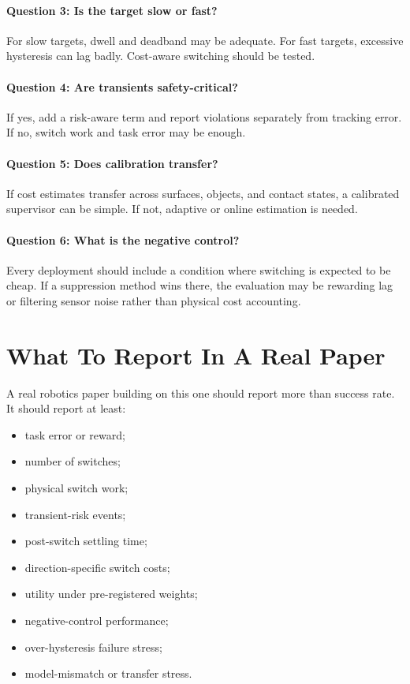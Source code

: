 \documentclass{article}
\begin{document}
\paragraph{Question 3: Is the target slow or fast?}
For slow targets, dwell and deadband may be adequate.
For fast targets, excessive hysteresis can lag badly.
Cost-aware switching should be tested.

\paragraph{Question 4: Are transients safety-critical?}
If yes, add a risk-aware term and report violations separately from tracking error.
If no, switch work and task error may be enough.

\paragraph{Question 5: Does calibration transfer?}
If cost estimates transfer across surfaces, objects, and contact states, a calibrated supervisor can be simple.
If not, adaptive or online estimation is needed.

\paragraph{Question 6: What is the negative control?}
Every deployment should include a condition where switching is expected to be cheap.
If a suppression method wins there, the evaluation may be rewarding lag or filtering sensor noise rather than physical cost accounting.

\section{What To Report In A Real Paper}

A real robotics paper building on this one should report more than success rate.
It should report at least:

\begin{itemize}
    \item task error or reward;
    \item number of switches;
    \item physical switch work;
    \item transient-risk events;
    \item post-switch settling time;
    \item direction-specific switch costs;
    \item utility under pre-registered weights;
    \item negative-control performance;
    \item over-hysteresis failure stress;
    \item model-mismatch or transfer stress.
\end{itemize}
\end{document}

